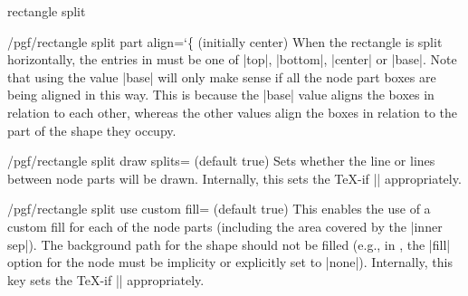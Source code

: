 \begin{shape}{rectangle split}
\begin{key}{/pgf/rectangle split part align={\ttfamily\char`\{} (initially center)}
        When the rectangle is split horizontally, the entries in 
        must be one of |top|, |bottom|, |center| or |base|. Note that using the
        value |base| will only make sense if all the node part boxes are being
        aligned in this way. This is because the |base| value aligns the boxes
        in relation to each other, whereas the other values align the boxes in
        relation to the part of the shape they occupy.
\begin{codeexample}[preamble={\usetikzlibrary{shapes.multipart}}]
\def\x{\Large w\nodepart{two}x\nodepart{three}\Huge y\nodepart{four}\tiny z}
\end{codeexample}
    \end{key}

    \begin{key}{/pgf/rectangle split draw splits= (default true)}
        Sets whether the line or lines between node parts will be drawn.
        Internally, this sets the \TeX-if |\ifpgfrectanglesplitdrawsplits|
        appropriately.
    \end{key}

    \begin{key}{/pgf/rectangle split use custom fill= (default true)}
        This enables the use of a custom fill for each of the node parts
        (including the area covered by the |inner sep|). The background path
        for the shape should not be filled (e.g., in \tikzname{}, the |fill|
        option for the node must be implicity or explicitly set to |none|).
        Internally, this key sets the \TeX-if
        |\ifpgfrectanglesplitusecustomfill| appropriately.
    \end{key}


\end{shape}
